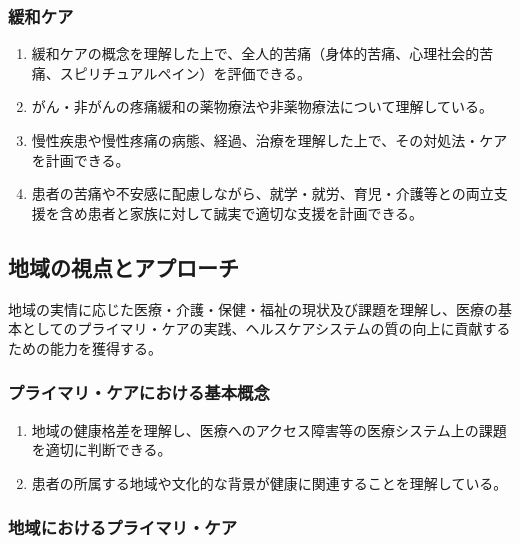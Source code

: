 \hypertarget{ux7de9ux548cux30b1ux30a2}{%
\subsubsection{緩和ケア}\label{ux7de9ux548cux30b1ux30a2}}

\begin{enumerate}
\def\labelenumi{\arabic{enumi}.}
\tightlist
\item
  緩和ケアの概念を理解した上で、全人的苦痛（身体的苦痛、心理社会的苦痛、スピリチュアルペイン）を評価できる。
\item
  がん・非がんの疼痛緩和の薬物療法や非薬物療法について理解している。
\item
  慢性疾患や慢性疼痛の病態、経過、治療を理解した上で、その対処法・ケアを計画できる。
\item
  患者の苦痛や不安感に配慮しながら、就学・就労、育児・介護等との両立支援を含め患者と家族に対して誠実で適切な支援を計画できる。
\end{enumerate}

\hypertarget{ux5730ux57dfux306eux8996ux70b9ux3068ux30a2ux30d7ux30edux30fcux30c1}{%
\subsection{地域の視点とアプローチ}\label{ux5730ux57dfux306eux8996ux70b9ux3068ux30a2ux30d7ux30edux30fcux30c1}}

地域の実情に応じた医療・介護・保健・福祉の現状及び課題を理解し、医療の基本としてのプライマリ・ケアの実践、ヘルスケアシステムの質の向上に貢献するための能力を獲得する。

\hypertarget{ux30d7ux30e9ux30a4ux30deux30eaux30b1ux30a2ux306bux304aux3051ux308bux57faux672cux6982ux5ff5}{%
\subsubsection{プライマリ・ケアにおける基本概念}\label{ux30d7ux30e9ux30a4ux30deux30eaux30b1ux30a2ux306bux304aux3051ux308bux57faux672cux6982ux5ff5}}

\begin{enumerate}
\def\labelenumi{\arabic{enumi}.}
\tightlist
\item
  地域の健康格差を理解し、医療へのアクセス障害等の医療システム上の課題を適切に判断できる。
\item
  患者の所属する地域や文化的な背景が健康に関連することを理解している。
\end{enumerate}

\hypertarget{ux5730ux57dfux306bux304aux3051ux308bux30d7ux30e9ux30a4ux30deux30eaux30b1ux30a2}{%
\subsubsection{地域におけるプライマリ・ケア}\label{ux5730ux57dfux306bux304aux3051ux308bux30d7ux30e9ux30a4ux30deux30eaux30b1ux30a2}}


